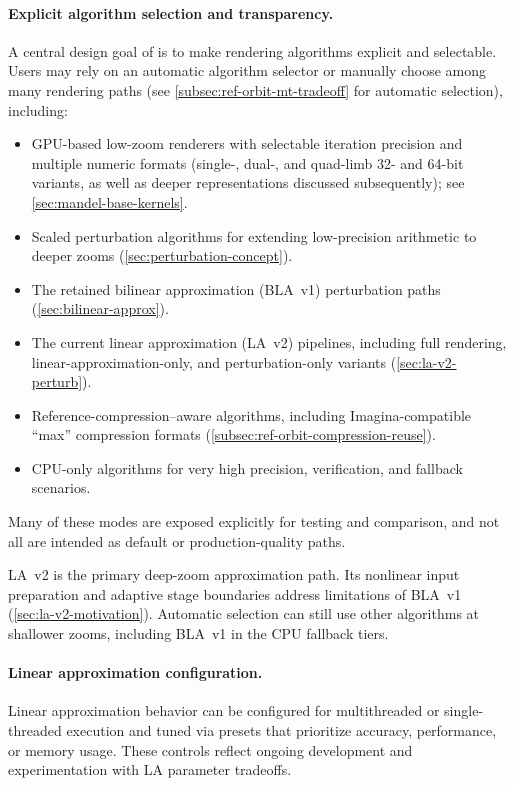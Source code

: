 \paragraph{Explicit algorithm selection and transparency.}
A central design goal of \FractalShark{} is to make rendering algorithms
explicit and selectable.  Users may rely on an automatic algorithm selector
or manually choose among many rendering paths (see \cref{subsec:ref-orbit-mt-tradeoff} for automatic selection), including:
\begin{itemize}
  \item GPU-based low-zoom renderers with selectable iteration precision and
        multiple numeric formats (single-, dual-, and quad-limb 32- and 64-bit
        variants, as well as deeper representations discussed subsequently);
        see \cref{sec:mandel-base-kernels}.
  \item Scaled perturbation algorithms for extending low-precision arithmetic
        to deeper zooms (\cref{sec:perturbation-concept}).
  \item The retained bilinear approximation (BLA~v1) perturbation paths
        (\cref{sec:bilinear-approx}).
  \item The current linear approximation (LA~v2) pipelines, including full rendering,
        linear-approximation-only, and perturbation-only variants
        (\cref{sec:la-v2-perturb}).
  \item Reference-compression–aware algorithms, including Imagina-compatible
        ``max'' compression formats (\cref{subsec:ref-orbit-compression-reuse}).
  \item CPU-only algorithms for very high precision, verification, and
        fallback scenarios.
\end{itemize}

Many of these modes are exposed explicitly for testing and comparison, and
not all are intended as default or production-quality paths.

LA~v2 is the primary deep-zoom approximation path. Its nonlinear
input preparation and adaptive stage boundaries address limitations
of BLA~v1 (\cref{sec:la-v2-motivation}). Automatic selection can still
use other algorithms at shallower zooms, including BLA~v1 in the CPU
fallback tiers.

\paragraph{Linear approximation configuration.}
Linear approximation behavior can be configured for multithreaded or
single-threaded execution and tuned via presets that prioritize accuracy,
performance, or memory usage.  These controls reflect ongoing development
and experimentation with LA parameter tradeoffs.


